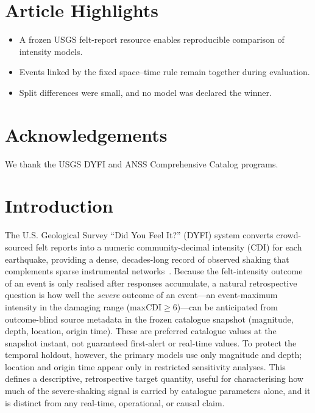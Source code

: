 \documentclass[pdflatex,sn-basic,iicol]{sn-jnl}
\begin{document}
\section*{Article Highlights}
\begin{itemize}\setlength{\itemsep}{1pt}\setlength{\parskip}{0pt}
\item A frozen USGS felt-report resource enables reproducible comparison of intensity models.
\item Events linked by the fixed space--time rule remain together during evaluation.
\item Split differences were small, and no model was declared the winner.
\end{itemize}

\section*{Acknowledgements}
We thank the USGS DYFI and ANSS Comprehensive Catalog programs.

\section{Introduction}\label{sec:intro}

The U.S. Geological Survey ``Did You Feel It?'' (DYFI) system converts
crowd-sourced felt reports into a numeric community-decimal intensity (CDI) for
each earthquake, providing a dense, decades-long record of observed shaking that
complements sparse instrumental networks~\citep{wald1999dyfi,atkinson2007dyfi,
wald2012dyfi,quitoriano2020dyfi}. Because the felt-intensity outcome of an event
is only realised after responses accumulate, a natural retrospective question is
how well the \emph{severe} outcome of an event---an event-maximum intensity in
the damaging range ($\mathrm{maxCDI}\geq 6$)---can be anticipated from
outcome-blind source metadata in the frozen catalogue snapshot (magnitude,
depth, location, origin time). These are preferred catalogue values at the
snapshot instant, not guaranteed first-alert or real-time values. To protect the temporal holdout, however, the
primary models use only magnitude and depth; location and origin time appear
only in restricted sensitivity analyses. This defines a descriptive,
retrospective target quantity,
useful for characterising how much of the severe-shaking signal is carried by
catalogue parameters alone, and it is distinct from any real-time,
operational, or causal claim.
\end{document}
